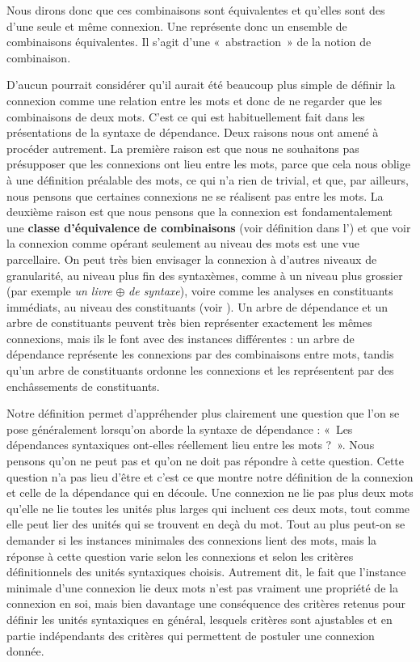 {Nous dirons donc que ces combinaisons sont équivalentes et qu’elles sont des  d’une seule et même connexion. Une  représente donc un ensemble de combinaisons équivalentes. Il s’agit d’une «~abstraction~» de la notion de combinaison.}

D’aucun pourrait considérer qu’il aurait été beaucoup plus simple de définir la connexion comme une relation entre les mots et donc de ne regarder que les combinaisons de deux mots. C’est ce qui est habituellement fait dans les présentations de la syntaxe de dépendance. Deux raisons nous ont amené à procéder autrement. La première raison est que nous ne souhaitons pas présupposer que les connexions ont lieu entre les mots, parce que cela nous oblige à une définition préalable des mots, ce qui n’a rien de trivial, et que, par ailleurs, nous pensons que certaines connexions ne se réalisent pas entre les mots. La deuxième raison est que nous pensons que la connexion est fondamentalement une \textbf{classe d’équivalence} \textbf{de combinaisons} (voir définition dans l’) et que voir la connexion comme opérant seulement au niveau des mots est une vue parcellaire. On peut très bien envisager la connexion à d’autres niveaux de granularité, au niveau plus fin des syntaxèmes, comme à un niveau plus grossier (par exemple \textit{un livre} ${\oplus}$ \textit{de syntaxe}), voire comme les analyses en constituants immédiats, au niveau des constituants (voir ). Un arbre de dépendance et un arbre de constituants peuvent très bien représenter exactement les mêmes connexions, mais ils le font avec des instances différentes : un arbre de dépendance représente les connexions par des combinaisons entre mots, tandis qu’un arbre de constituants ordonne les connexions et les représentent par des enchâssements de constituants.

Notre définition permet d’appréhender plus clairement une question que l’on se pose généralement lorsqu’on aborde la syntaxe de dépendance : «~Les dépendances syntaxiques ont-elles réellement lieu entre les mots ?~». Nous pensons qu’on ne peut pas et qu’on ne doit pas répondre à cette question. Cette question n’a pas lieu d’être et c’est ce que montre notre définition de la connexion et celle de la dépendance qui en découle. Une connexion ne lie pas plus deux mots qu’elle ne lie toutes les unités plus larges qui incluent ces deux mots, tout comme elle peut lier des unités qui se trouvent en deçà du mot. Tout au plus peut-on se demander si les instances minimales des connexions lient des mots, mais la réponse à cette question varie selon les connexions et selon les critères définitionnels des unités syntaxiques choisis. Autrement dit, le fait que l’instance minimale d’une connexion lie deux mots n’est pas vraiment une propriété de la connexion en soi, mais bien davantage une conséquence des critères retenus pour définir les unités syntaxiques en général, lesquels critères sont ajustables et en partie indépendants des critères qui permettent de postuler une connexion donnée.


